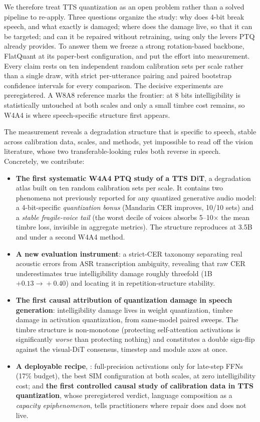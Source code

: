 We therefore treat TTS quantization as an open problem rather than a solved pipeline to re-apply. Three questions organize the study: why does 4-bit break speech, and what exactly is damaged; where does the damage live, so that it can be targeted; and can it be repaired without retraining, using only the levers PTQ already provides. To answer them we freeze a strong rotation-based backbone, FlatQuant \citep{sun2025flatquant} at its paper-best configuration, and put the effort into measurement. Every claim rests on ten independent random calibration sets per scale rather than a single draw, with strict per-utterance pairing and paired bootstrap confidence intervals for every comparison. The decisive experiments are preregistered. A W8A8 reference marks the frontier: at 8 bits intelligibility is statistically untouched at both scales and only a small timbre cost remains, so W4A4 is where speech-specific structure first appears.
 
The measurement reveals a degradation structure that is specific to speech, stable across calibration data, scales, and methods, yet impossible to read off the vision literature, whose two transferable-looking rules both reverse in speech. Concretely, we contribute:
\begin{itemize}
\item \textbf{The first systematic W4A4 PTQ study of a TTS DiT}, a degradation atlas built on ten random calibration sets per scale. It contains two phenomena not previously reported for any quantized generative audio model: a 4-bit-specific \emph{quantization bonus} (Mandarin CER improves, 10/10 sets) and a \emph{stable fragile-voice tail} (the worst decile of voices absorbs 5--10$\times$ the mean timbre loss, invisible in aggregate metrics). The structure reproduces at 3.5B and under a second W4A4 method.
\item \textbf{A new evaluation instrument}: a strict-CER taxonomy separating real acoustic errors from ASR transcription ambiguity, revealing that raw CER underestimates true intelligibility damage roughly threefold (1B $+0.13\!\to\!+0.40$) and locating it in repetition-structure stability.
\item \textbf{The first causal attribution of quantization damage in speech generation}: intelligibility damage lives in weight quantization, timbre damage in activation quantization, from same-model paired sweeps. The timbre structure is non-monotone (protecting self-attention activations is significantly \emph{worse} than protecting nothing) and constitutes a double sign-flip against the visual-DiT consensus, timestep and module axes at once.
\item \textbf{A deployable recipe}, : full-precision activations only for late-step FFNs (17\% budget), the best SIM configuration at both scales, at zero intelligibility cost; and \textbf{the first controlled causal study of calibration data in TTS quantization}, whose preregistered verdict, language composition as a \emph{capacity epiphenomenon}, tells practitioners where repair does and does not live.
\end{itemize}
